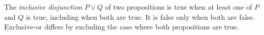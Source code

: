 
The \emph{inclusive disjunction} $P\lor Q$ of two propositions is true when at least one of $P$ and $Q$ is true, including when both are true. It is false only when both are false. Exclusive-or differs by excluding the case where both propositions are true.
